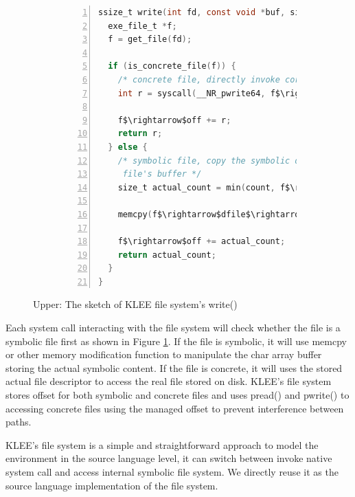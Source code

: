 \documentclass[sigplan, nonacm]{acmart}\settopmatter{printfolios=true,printccs=false,printacmref=false}
\newcommand{\tool}{\textsc{GenSym}\xspace}
\begin{document}
\begin{figure}[t]
\centering
\begin{subfigure}{0.5\textwidth}
\begin{lstlisting}[style=small,language=C,numbers=left,stepnumber=1,xleftmargin=2em,numberstyle=\ttfamily]
ssize_t write(int fd, const void *buf, size_t count) {
  exe_file_t *f;
  f = get_file(fd);

  if (is_concrete_file(f)) {
    /* concrete file, directly invoke corresponding native syscall */
    int r = syscall(__NR_pwrite64, f$\rightarrow$fd, buf, count, (off64_t) f$\rightarrow$off);

    f$\rightarrow$off += r;
    return r;
  } else {
    /* symbolic file, copy the symbolic data from buf into current
     file's buffer */
    size_t actual_count = min(count, f$\rightarrow$dfile->size - f$\rightarrow$off);

    memcpy(f$\rightarrow$dfile$\rightarrow$contents + f$\rightarrow$off, buf, actual_count);

    f$\rightarrow$off += actual_count;
    return actual_count;
  }
}
\end{lstlisting}
\vspace{-1em}
\end{subfigure}
\caption{
  Upper: The sketch of KLEE file system's write() }
\vspace{-0.3in}
\label{fig:example}
\end{figure}

 Each system call interacting with the file system will check whether the file is a symbolic file first as shown in Figure \ref{fig:example}. If the file is symbolic, it will use memcpy or other memory modification function to manipulate the char array buffer storing the actual symbolic content. If the file is concrete, it will uses the stored actual file descriptor to access the real file stored on disk. KLEE's file system stores offset for both symbolic and concrete files and uses pread() and pwrite() to accessing concrete files using the managed offset to prevent interference between paths.\par
 KLEE's file system is a simple and straightforward approach to model the environment in the source language level, it can switch between invoke native system call and access internal symbolic file system. We directly reuse it as the source language implementation of the file system.
\end{document}
